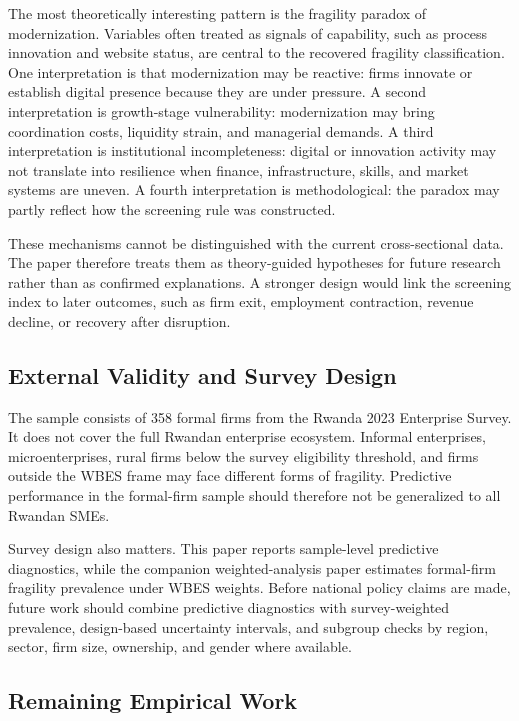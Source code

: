 The most theoretically interesting pattern is the fragility paradox of modernization. Variables often treated as signals of capability, such as process innovation and website status, are central to the recovered fragility classification. One interpretation is that modernization may be reactive: firms innovate or establish digital presence because they are under pressure. A second interpretation is growth-stage vulnerability: modernization may bring coordination costs, liquidity strain, and managerial demands. A third interpretation is institutional incompleteness: digital or innovation activity may not translate into resilience when finance, infrastructure, skills, and market systems are uneven. A fourth interpretation is methodological: the paradox may partly reflect how the screening rule was constructed.

These mechanisms cannot be distinguished with the current cross-sectional data. The paper therefore treats them as theory-guided hypotheses for future research rather than as confirmed explanations. A stronger design would link the screening index to later outcomes, such as firm exit, employment contraction, revenue decline, or recovery after disruption.

\subsection{External Validity and Survey Design}

The sample consists of 358 formal firms from the Rwanda 2023 Enterprise Survey. It does not cover the full Rwandan enterprise ecosystem. Informal enterprises, microenterprises, rural firms below the survey eligibility threshold, and firms outside the WBES frame may face different forms of fragility. Predictive performance in the formal-firm sample should therefore not be generalized to all Rwandan SMEs.

Survey design also matters. This paper reports sample-level predictive diagnostics, while the companion weighted-analysis paper estimates formal-firm fragility prevalence under WBES weights. Before national policy claims are made, future work should combine predictive diagnostics with survey-weighted prevalence, design-based uncertainty intervals, and subgroup checks by region, sector, firm size, ownership, and gender where available.

\subsection{Remaining Empirical Work}

